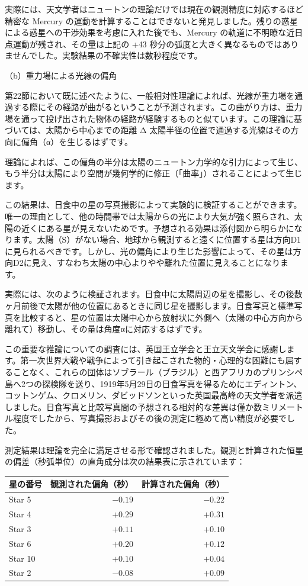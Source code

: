 \documentclass[a4paper,11pt,openany]{ltjsbook}
\begin{document}
実際には、天文学者はニュートンの理論だけでは現在の観測精度に対応するほど精密な Mercury の運動を計算することはできないと発見しました。残りの惑星による惑星への干渉効果を考慮に入れた後でも、Mercury の軌道に不明瞭な近日点運動が残され、その量は上記の +43 秒分の弧度と大きく異なるものではありませんでした。実験結果の不確実性は数秒程度です。

（b）重力場による光線の偏角

第22節において既に述べたように、一般相対性理論によれば、光線が重力場を通過する際にその経路が曲がるということが予測されます。この曲がり方は、重力場を通って投げ出された物体の経路が経験するものと似ています。この理論に基づいては、太陽から中心までの距離 Δ 太陽半径の位置で通過する光線はその方向に偏角（α）を生じるはずです。

理論によれば、この偏角の半分は太陽のニュートン力学的な引力によって生じ、もう半分は太陽により空間が幾何学的に修正（「曲率」）されることによって生じます。

この結果は、日食中の星の写真撮影によって実験的に検証することができます。唯一の理由として、他の時間帯では太陽からの光により大気が強く照らされ、太陽の近くにある星が見えないためです。予想される効果は添付図から明らかになります。太陽（S）がない場合、地球から観測すると遠くに位置する星は方向D1に見られるべきです。しかし、光の偏角により生じた影響によって、その星は方向D2に見え、すなわち太陽の中心よりやや離れた位置に見えることになります。

実際には、次のように検証されます。日食中に太陽周辺の星を撮影し、その後数ヶ月前後で太陽が他の位置にあるときに同じ星を撮影します。日食写真と標準写真を比較すると、星の位置は太陽中心から放射状に外側へ（太陽の中心方向から離れて）移動し、その量は角度αに対応するはずです。

この重要な推論についての調査には、英国王立学会と王立天文学会に感謝します。第一次世界大戦や戦争によって引き起こされた物的・心理的な困難にも屈することなく、これらの団体はソブラール（ブラジル）と西アフリカのプリンシペ島へ2つの探検隊を送り、1919年5月29日の日食写真を得るためにエディントン、コットンゲム、クロメリン、ダビッドソンといった英国最高峰の天文学者を派遣しました。日食写真と比較写真間の予想される相対的な差異は僅か数ミリメートル程度でしたから、写真撮影およびその後の測定に極めて高い精度が必要でした。

測定結果は理論を完全に満足させる形で確認されました。観測と計算された恒星の偏差（秒弧単位）の直角成分は次の結果表に示されています：



\begin{center}
\begin{tabular}{lrr}
\toprule
星の番号 & 観測された偏角（秒） & 計算された偏角（秒） \\
\midrule
Star 5  & $-0.19$ & $-0.22$ \\
Star 4  & $+0.29$ & $+0.31$ \\
Star 3  & $+0.11$ & $+0.10$ \\
Star 6  & $+0.20$ & $+0.12$ \\
Star 10 & $+0.10$ & $+0.04$ \\
Star 2  & $-0.08$ & $+0.09$ \\
\bottomrule
\end{tabular}
\end{center}
\end{document}
